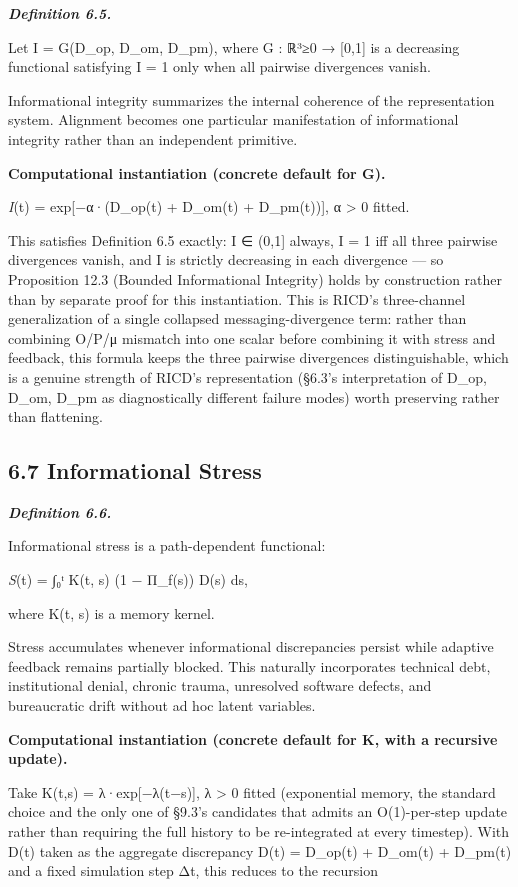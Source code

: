 \documentclass[
]{article}
\begin{document}
\emph{\textbf{Definition 6.5.}}

Let I = G(D\_op, D\_om, D\_pm), where G : ℝ³≥0 → {[}0,1{]} is a
decreasing functional satisfying I = 1 only when all pairwise
divergences vanish.

Informational integrity summarizes the internal coherence of the
representation system. Alignment becomes one particular manifestation of
informational integrity rather than an independent primitive.

\textbf{Computational instantiation (concrete default for G).}

\emph{I}(t) = exp{[}−α·(D\_op(t) + D\_om(t) + D\_pm(t)){]}, α
\textgreater{} 0 fitted.

This satisfies Definition 6.5 exactly: I ∈ (0,1{]} always, I = 1 iff all
three pairwise divergences vanish, and I is strictly decreasing in each
divergence --- so Proposition 12.3 (Bounded Informational Integrity)
holds by construction rather than by separate proof for this
instantiation. This is RICD's three-channel generalization of a single
collapsed messaging-divergence term: rather than combining O/P/μ
mismatch into one scalar before combining it with stress and feedback,
this formula keeps the three pairwise divergences distinguishable, which
is a genuine strength of RICD's representation (§6.3's interpretation of
D\_op, D\_om, D\_pm as diagnostically different failure modes) worth
preserving rather than flattening.

\hypertarget{informational-stress}{%
\subsection{6.7 Informational Stress}\label{informational-stress}}

\emph{\textbf{Definition 6.6.}}

Informational stress is a path-dependent functional:

\emph{S}(t) = ∫₀ᵗ K(t, s) (1 − Π\_f(s)) D(s) ds,

where K(t, s) is a memory kernel.

Stress accumulates whenever informational discrepancies persist while
adaptive feedback remains partially blocked. This naturally incorporates
technical debt, institutional denial, chronic trauma, unresolved
software defects, and bureaucratic drift without ad hoc latent
variables.

\textbf{Computational instantiation (concrete default for K, with a
recursive update).}

Take K(t,s) = λ·exp{[}−λ(t−s){]}, λ \textgreater{} 0 fitted (exponential
memory, the standard choice and the only one of §9.3's candidates that
admits an O(1)-per-step update rather than requiring the full history to
be re-integrated at every timestep). With D(t) taken as the aggregate
discrepancy D(t) = D\_op(t) + D\_om(t) + D\_pm(t) and a fixed simulation
step Δt, this reduces to the recursion
\end{document}
